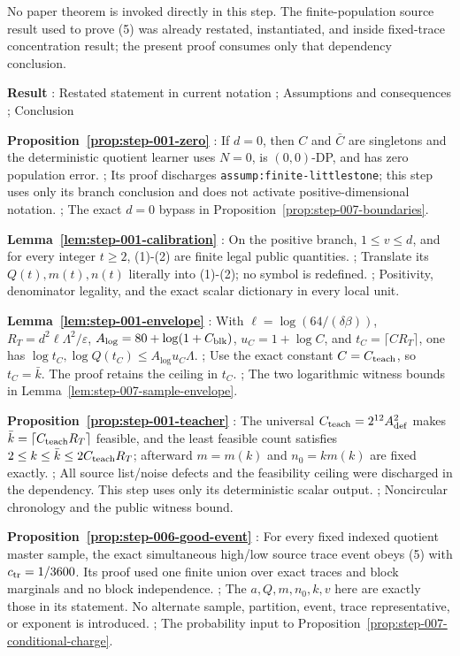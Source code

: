 No paper theorem is invoked directly in this step. The finite-population
source result used to prove (5) was already restated, instantiated, and
 inside fixed-trace concentration result; the present proof consumes only that 
dependency conclusion.

\noindent\textbf{ Result }:  Restated statement in current notation ;  Assumptions and consequences ;  Conclusion \par
\noindent\textbf{ Proposition~\ref{prop:step-001-zero} }:  If \(d=0\), then \(C\) and \(\bar C\) are singletons and the deterministic quotient learner uses \(N=0\), is \((0,0)\)-DP, and has zero population error. ;  Its  proof discharges \texttt{assump:finite-littlestone}; this step uses only its branch conclusion and does not activate positive-dimensional notation. ;  The exact \(d=0\) bypass in Proposition~\ref{prop:step-007-boundaries}. \par
\noindent\textbf{ Lemma~\ref{lem:step-001-calibration} }:  On the positive branch, \(1\le v\le d\), and for every integer \(t\ge2\), (1)-(2) are finite legal public quantities. ;  Translate its \(Q(t),m(t),n(t)\) literally into (1)-(2); no symbol is redefined. ;  Positivity, denominator legality, and the exact scalar dictionary in every local unit. \par
\noindent\textbf{ Lemma~\ref{lem:step-001-envelope} }:  With \(\ell=\log(64/(\delta\beta))\), \(R_T=d^2\ell\Lambda^2/\varepsilon\), \(A_{\log}=80+\log(1+C_{\rm blk})\), \(u_C=1+\log C\), and \(t_C=\lceil CR_T\rceil\), one has \(\log t_C,\log Q(t_C)\le A_{\log}u_C\Lambda\). ;  Use the exact  constant \(C=C_{\rm teach}\), so \(t_C=\bar k\). The  proof retains the ceiling in \(t_C\). ;  The two logarithmic witness bounds in Lemma~\ref{lem:step-007-sample-envelope}. \par
\noindent\textbf{ Proposition~\ref{prop:step-001-teacher} }:  The universal \(C_{\rm teach}=2^{12}A_{\rm def}^2\) makes \(\bar k=\lceil C_{\rm teach}R_T\rceil\) feasible, and the least feasible count satisfies \(2\le k\le\bar k\le2C_{\rm teach}R_T\); afterward \(m=m(k)\) and \(n_0=km(k)\) are fixed exactly. ;  All source list/noise defects and the feasibility ceiling were discharged in the  dependency. This step uses only its deterministic scalar output. ;  Noncircular chronology and the public witness bound. \par
\noindent\textbf{ Proposition~\ref{prop:step-006-good-event} }:  For every fixed indexed quotient master sample, the exact simultaneous high/low source trace event obeys (5) with \(c_{\rm tr}=1/3600\). Its proof used one finite union over exact traces and block marginals and no block independence. ;  The \(a,Q,m,n_0,k,v\) here are exactly those in its  statement. No alternate sample, partition, event, trace representative, or exponent is introduced. ;  The probability input to Proposition~\ref{prop:step-007-conditional-charge}. \par
